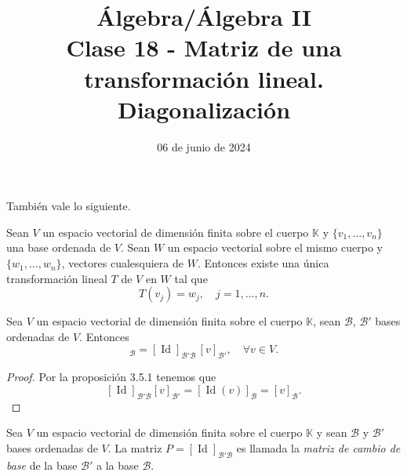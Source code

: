 \documentclass[handout]{beamer} %
\title[Clase 18 -  Matriz de una transformación lineal. Diagonalización]{Álgebra/Álgebra II \\Clase 18 -  Matriz de una transformación lineal. Diagonalización}
\author[]{}
\institute[]{\normalsize FAMAF / UNC
	\\[\baselineskip] ${}^{}$
	\\[\baselineskip]
}
\date[06/06/2024]{06 de junio de 2024}
\newcommand{\Id}{\operatorname{Id}}
\newcommand{\K}{\mathbb K}
\begin{document}
\begin{frame}
\maketitle
\end{frame}



\begin{frame}
    \pause
También vale  lo siguiente.
\pause
\begin{teorema}\label{th-tl-definida-en-base}
    Sean $V$ un espacio vectorial de dimensión finita sobre el cuerpo $\K$ y $\{v_1,\ldots,v_n\}$  una base ordenada de $V$. Sean $W$ un espacio vectorial sobre el mismo cuerpo y $\{w_1,\ldots,w_n\}$, vectores cualesquiera de $W$. Entonces existe una única transformación  lineal $T$ de $V$ en $W$ tal que
    \begin{equation*}
    T(v_j) = w_j, \quad j=1,\ldots,n.
    \end{equation*}
\end{teorema}

\end{frame}

\begin{frame}
    \begin{corolario}\label{cor-cambio-de-base}
        Sea $V$ un espacio vectorial de dimensión finita sobre el cuerpo $\K$, sean $\mathcal B$, $\mathcal B'$  bases ordenadas de $V$. Entonces 
        \begin{equation*}
            [v]_{\mathcal B} = [\Id]_{\mathcal B' \mathcal B}\, [v]_{\mathcal B'}, \quad \forall v \in V.
        \end{equation*}
    \end{corolario}\pause
    \begin{proof}\pause
        Por la proposición 3.5.1 tenemos que 
        $$
        [\Id]_{\mathcal B' \mathcal B}  [v]_{\mathcal B'} = [\Id (v)]_{\mathcal B} = [v]_{\mathcal B}.
        $$
    \end{proof}
    \pause
    \begin{definicion}
        Sea $V$ un espacio vectorial de dimensión finita sobre el cuerpo $\K$ y sean $\mathcal B$ y $\mathcal B'$ bases ordenadas de $V$. La matriz $P =[\Id]_{\mathcal B' \mathcal B}$  es llamada la \textit{matriz de cambio de base}  de la base $\mathcal B'$  a la base $\mathcal B$. 
    \end{definicion}

    

\end{frame}
\end{document}
